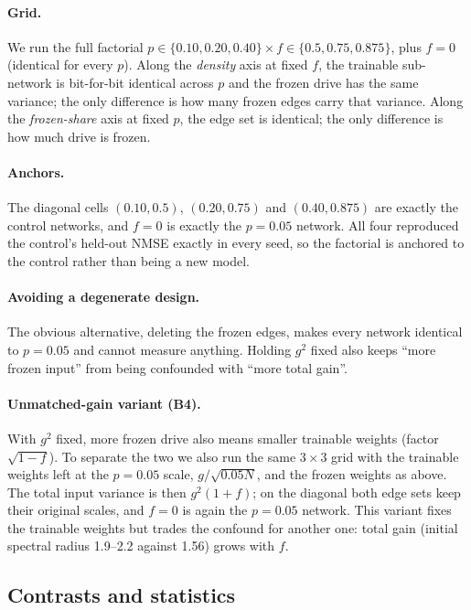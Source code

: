 \documentclass[11pt]{article}
\begin{document}
\paragraph{Grid.} We run the full factorial
$p\in\{0.10,0.20,0.40\}\times f\in\{0.5,0.75,0.875\}$, plus $f=0$ (identical
for every $p$). Along the \emph{density} axis at fixed $f$, the trainable
sub-network is bit-for-bit identical across $p$ and the frozen drive has the
same variance; the only difference is how many frozen edges carry that
variance. Along the \emph{frozen-share} axis at fixed $p$, the edge set is
identical; the only difference is how much drive is frozen.

\paragraph{Anchors.} The diagonal cells $(0.10,0.5)$, $(0.20,0.75)$ and
$(0.40,0.875)$ are exactly the control networks, and $f=0$ is exactly the
$p=0.05$ network. All four reproduced the control's held-out NMSE exactly in
every seed, so the factorial is anchored to the control rather than being a
new model.

\paragraph{Avoiding a degenerate design.} The obvious alternative, deleting
the frozen edges, makes every network identical to $p=0.05$ and cannot measure
anything. Holding $g^2$ fixed also keeps ``more frozen input'' from being
confounded with ``more total gain''.

\paragraph{Unmatched-gain variant (B4).} With $g^2$ fixed, more frozen drive
also means smaller trainable weights (factor $\sqrt{1-f}$). To separate the
two we also run the same $3\times3$ grid with the trainable weights left at
the $p=0.05$ scale, $g/\sqrt{0.05N}$, and the frozen weights as above. The
total input variance is then $g^2(1+f)$; on the diagonal both edge sets keep
their original scales, and $f=0$ is again the $p=0.05$ network. This variant
fixes the trainable weights but trades the confound for another one: total
gain (initial spectral radius 1.9--2.2 against 1.56) grows with $f$.

\subsection{Contrasts and statistics}
\end{document}
